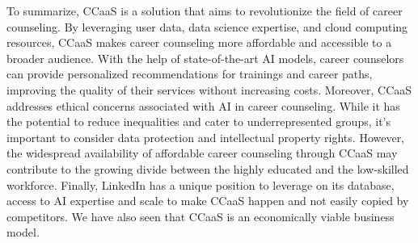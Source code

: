 To summarize, CCaaS is a solution that aims to revolutionize the field of career counseling. By leveraging
user data, data science expertise, and cloud computing resources, CCaaS makes career counseling more affordable
and accessible to a broader audience. With the help of state-of-the-art AI models, career counselors can provide
personalized recommendations for trainings and career paths, improving the quality of their services without
increasing costs. Moreover, CCaaS addresses ethical concerns associated with AI in career counseling. While it
has the potential to reduce inequalities and cater to underrepresented groups, it's important to consider data
protection and intellectual property rights. However, the widespread availability of affordable career counseling
through CCaaS may contribute to the growing divide between the highly educated and the low-skilled workforce.
Finally, LinkedIn has a unique position to leverage on its database, access to AI expertise and scale to 
make CCaaS happen and not easily copied by competitors. We have also seen that CCaaS is an economically viable
business model.